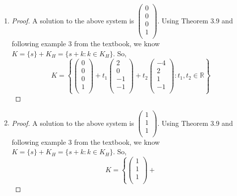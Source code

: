 \documentclass[11pt]{scrartcl}
\begin{document}
\begin{enumerate}[label=\alph*.]
	\item{ 
		\begin{proof}
			A solution to the above system is  
			$
			\begin{pmatrix}
				0\\
				0\\
				0\\
				1\\
			\end{pmatrix}
			$.	
			Using Theorem 3.9 and following example 3 from the textbook, we know $K = \{s\} + K_H = \{s + k : k \in K_H \}$.
			So, 
			\[
			K=
			\left\{
				\begin{pmatrix}
					0\\
					0\\
					0\\
					1\\
				\end{pmatrix} +
				t_1\begin{pmatrix}
					2\\
					0\\
					-1\\
					-1\\
				\end{pmatrix}+
				t_2\begin{pmatrix}
					-4\\
					2\\
					1\\
					-1\\
				\end{pmatrix}: t_1, t_2 \in \mathbb{R}
			\right\}
			\]
		\end{proof}
	}
	\item{
		\begin{proof}
			A solution to the above system is  
			$
			\begin{pmatrix}
				1\\
				1\\
				1\\
			\end{pmatrix}
			$.	
			Using Theorem 3.9 and following example 3 from the textbook, we know $K = \{s\} + K_H = \{s + k : k \in K_H \}$.
			So, 
			\[
			K=
			\left\{
				\begin{pmatrix}
					1\\
					1\\
					1\\
				\end{pmatrix} +
\]
\end{proof}}
\end{enumerate}
\end{document}
